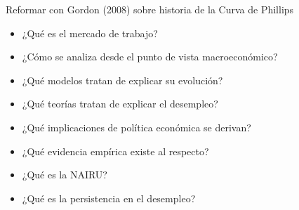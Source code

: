 \documentclass{nuevotema}
\begin{document}
\ideaclave

Reformar con Gordon (2008) sobre historia de la Curva de Phillips

\begin{itemize}
	\item ¿Qué es el mercado de trabajo?
	\item ¿Cómo se analiza desde el punto de vista macroeconómico?
	\item ¿Qué modelos tratan de explicar su evolución?
	\item ¿Qué teorías tratan de explicar el desempleo?
	\item ¿Qué implicaciones de política económica se derivan?
	\item ¿Qué evidencia empírica existe al respecto?
	\item ¿Qué es la NAIRU?
	\item ¿Qué es la persistencia en el desempleo?
\end{itemize}

\esquemacorto
\end{document}

